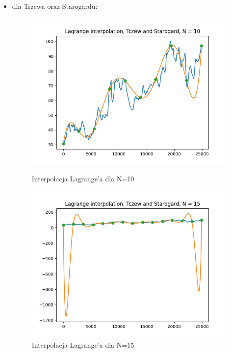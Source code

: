 \documentclass{article}
\begin{document}
\begin{itemize}
    \newpage
    \item dla Trzewa oraz Starogardu:
    \begin{figure}[!htb]
      \includegraphics[width=\linewidth]{Tczew_and_Starogard_Lagrange_N_10.png}
      \caption{Interpolacja Lagrange'a dla N=10}
    \endminipage\hfill
      \includegraphics[width=\linewidth]{Tczew_and_Starogard_Lagrange_N_15.png}
      \caption{Interpolacja Lagrange'a dla N=15}
    \endminipage\hfill
    \end{figure}
    

\end{itemize}
\end{document}
